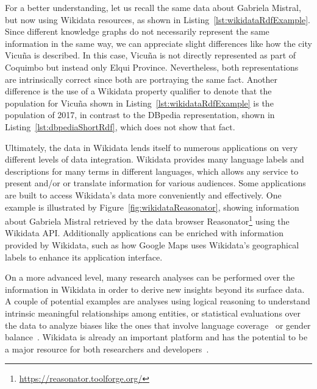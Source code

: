For a better understanding, let us recall the same data about Gabriela Mistral, but now using 
Wikidata resources, as shown in Listing~\ref{lst:wikidataRdfExample}. Since different knowledge 
graphs do not necessarily represent the same information in the same way, we can appreciate slight 
differences like how the city Vicuña is described. In this case, Vicuña is not directly represented 
as part of Coquimbo but instead only Elqui Province. Nevertheless, both representations are 
intrinsically correct since both are portraying the same fact. Another difference is the use of 
a Wikidata property qualifier to denote that the population for Vicuña shown in 
Listing~\ref{lst:wikidataRdfExample} is the population of 2017, in contrast to the DBpedia 
representation, shown in Listing~\ref{lst:dbpediaShortRdf}, which does not show that fact.

Ultimately, the data in Wikidata lends itself to numerous applications on very different levels 
of data integration. Wikidata provides many language labels and descriptions for many terms in 
different languages, which allows any service to present and/or or translate information for 
various audiences. Some applications are built to access Wikidata’s data more conveniently and 
effectively. One example is illustrated by Figure~\ref{fig:wikidataReasonator}, showing 
information about Gabriela Mistral retrieved by the data browser 
Reasonator\footnote{\url{https://reasonator.toolforge.org/}} using the Wikidata API. Additionally 
applications can be enriched with information provided by Wikidata, such as how Google Maps 
uses Wikidata’s geographical labels to enhance its application interface. 

On a more advanced level, many research analyses can be performed over the information in 
Wikidata in order to derive new insights beyond its surface data. A couple of potential examples 
are analyses using logical reasoning to understand intrinsic meaningful relationships among 
entities, or statistical evaluations over the data to analyze biases like the ones that involve 
language coverage~\cite{key:wikidataHale13} or gender balance~\cite{key:socialWikidataWagner16}. 
Wikidata is already an important platform and has the potential to be a major resource for both 
researchers and developers~\cite{wikidata:GeneWikiInitiative, wikidata:RiseWikidataVrandecic6682924}.

